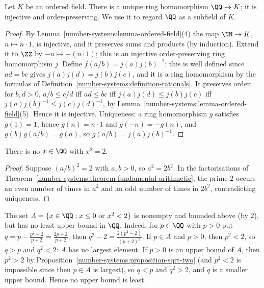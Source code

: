 \begin{proposition}\label{number-systems:proposition-rationals-initial}
Let $K$ be an ordered field. There is a unique ring homomorphism
$\QQ \to K$; it is injective and order-preserving. We use it to regard $\QQ$ as a
subfield of $K$.
\end{proposition}

\begin{proof}
By Lemma~\ref{number-systems:lemma-ordered-field}(4) the map $\NN \to K$,
$n \mapsto n \cdot 1$, is injective, and it preserves sums and products (by
induction). Extend it to $\ZZ$ by $-n \mapsto -(n \cdot 1)$; this is an
injective order-preserving ring homomorphism $j$. Define
$f(a/b) = j(a) j(b)^{-1}$; this is well defined since $ad = bc$ gives
$j(a)j(d) = j(b)j(c)$, and it is a ring homomorphism by the formulas of
Definition~\ref{number-systems:definition-rationals}. It preserves order: for
$b, d > 0$, $a/b \leq c/d$ iff $ad \leq bc$ iff $j(a)j(d) \leq j(b)j(c)$ iff
$j(a)j(b)^{-1} \leq j(c)j(d)^{-1}$, by Lemma~\ref{number-systems:lemma-ordered-field}(5).
Hence it is injective. Uniqueness: a ring homomorphism $g$ satisfies
$g(1) = 1$, hence $g(n) = n \cdot 1$ and $g(-n) = -g(n)$, and
$g(b) g(a/b) = g(a)$, so $g(a/b) = j(a) j(b)^{-1}$.
\end{proof}

\begin{proposition}\label{number-systems:proposition-sqrt-two}
There is no $x \in \QQ$ with $x^2 = 2$.
\end{proposition}

\begin{proof}
Suppose $(a/b)^2 = 2$ with $a, b > 0$, so $a^2 = 2b^2$. In the factorisations of
Theorem~\ref{number-systems:theorem-fundamental-arithmetic}, the prime $2$
occurs an even number of times in $a^2$ and an odd number of times in $2b^2$,
contradicting uniqueness.
\end{proof}

\begin{counterexample}\label{number-systems:counterexample-rationals-incomplete}
The set $A = \{x \in \QQ : x \leq 0 \text{ or } x^2 < 2\}$ is nonempty and
bounded above (by $2$), but has no least upper bound in $\QQ$. Indeed, for
$p \in \QQ$ with $p > 0$ put $q = p - \frac{p^2 - 2}{p + 2} = \frac{2p + 2}{p + 2}$;
then $q^2 - 2 = \frac{2(p^2 - 2)}{(p + 2)^2}$. If $p \in A$ and $p > 0$, then
$p^2 < 2$, so $q > p$ and $q^2 < 2$: $A$ has no largest element. If $p > 0$ is an
upper bound of $A$, then $p^2 > 2$ by
Proposition~\ref{number-systems:proposition-sqrt-two} (and $p^2 < 2$ is
impossible since then $p \in A$ is largest), so $q < p$ and $q^2 > 2$, and $q$ is
a smaller upper bound. Hence no upper bound is least.
\end{counterexample}

